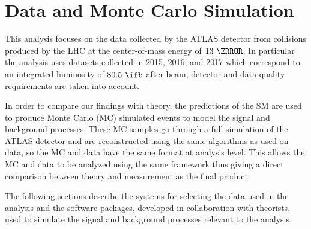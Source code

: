 \chapter{Data and Monte Carlo Simulation} \label{chap:data}

This analysis focuses on the data collected by the ATLAS detector from \pp
collisions produced by the LHC at the center-of-mass energy of $13~\TeV$.  In
particular the analysis uses datasets collected in 2015, 2016, and 2017 which
correspond to an integrated luminosity of $80.5~\ifb$ after beam, detector and
data-quality requirements are taken into account. 

In order to compare our findings with theory, the predictions of the SM are
used to produce Monte Carlo (MC) simulated events to model the signal and
background processes.  These MC samples go through a full simulation of the
ATLAS detector and are reconstructed using the same algorithms as used on data,
so the MC and data have the same format at analysis level. This allows the MC
and data to be analyzed using the same framework thus giving a direct
comparison between theory and measurement as the final product.

The following sections describe the systems for selecting the data used in the
analysis and the software packages, developed in collaboration with theorists,
used to simulate the signal and background processes relevant to the analysis.




